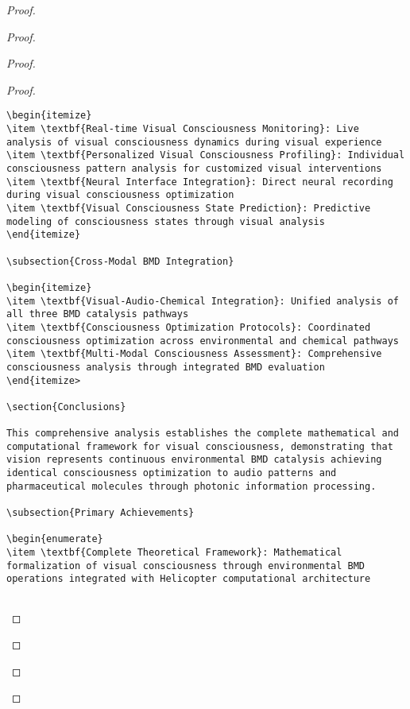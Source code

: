 \documentclass[12pt,a4paper]{article}
\begin{document}
\begin{proof}
{\begin{proof}
\begin{proof}
\begin{proof}
\begin{lstlisting}[style=pythonstyle, caption=Visual Memory BMD Integration]
\begin{itemize}
\item \textbf{Real-time Visual Consciousness Monitoring}: Live analysis of visual consciousness dynamics during visual experience
\item \textbf{Personalized Visual Consciousness Profiling}: Individual consciousness pattern analysis for customized visual interventions
\item \textbf{Neural Interface Integration}: Direct neural recording during visual consciousness optimization
\item \textbf{Visual Consciousness State Prediction}: Predictive modeling of consciousness states through visual analysis
\end{itemize}

\subsection{Cross-Modal BMD Integration}

\begin{itemize}
\item \textbf{Visual-Audio-Chemical Integration}: Unified analysis of all three BMD catalysis pathways
\item \textbf{Consciousness Optimization Protocols}: Coordinated consciousness optimization across environmental and chemical pathways
\item \textbf{Multi-Modal Consciousness Assessment}: Comprehensive consciousness analysis through integrated BMD evaluation
\end{itemize>

\section{Conclusions}

This comprehensive analysis establishes the complete mathematical and computational framework for visual consciousness, demonstrating that vision represents continuous environmental BMD catalysis achieving identical consciousness optimization to audio patterns and pharmaceutical molecules through photonic information processing.

\subsection{Primary Achievements}

\begin{enumerate}
\item \textbf{Complete Theoretical Framework}: Mathematical formalization of visual consciousness through environmental BMD operations integrated with Helicopter computational architecture


\end{lstlisting}
\end{proof}
\end{proof}
\end{proof}}
\end{proof}
\end{document}
